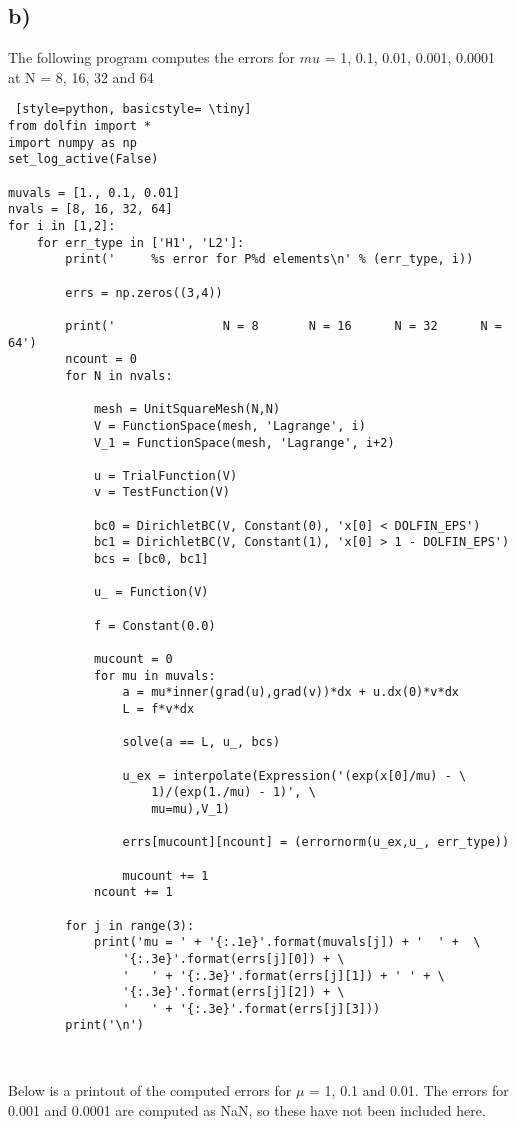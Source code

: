 \documentclass[a4paper,english,12pt,twoside]{article}
\begin{document}
\subsection*{b)}

The following program computes the errors for $mu$ = 1, 0.1, 0.01, 0.001, 0.0001 at N = 8, 16, 32 and 64
\begin{lstlisting} [style=python, basicstyle= \tiny]
from dolfin import *
import numpy as np
set_log_active(False)

muvals = [1., 0.1, 0.01]
nvals = [8, 16, 32, 64]
for i in [1,2]:
	for err_type in ['H1', 'L2']:
		print('	    %s error for P%d elements\n' % (err_type, i))

		errs = np.zeros((3,4))

		print('           	  N = 8  	  N = 16 	  N = 32  	  N = 64')
		ncount = 0
		for N in nvals:
		
			mesh = UnitSquareMesh(N,N)
			V = FunctionSpace(mesh, 'Lagrange', i)
			V_1 = FunctionSpace(mesh, 'Lagrange', i+2)

			u = TrialFunction(V)
			v = TestFunction(V)

			bc0 = DirichletBC(V, Constant(0), 'x[0] < DOLFIN_EPS')
			bc1 = DirichletBC(V, Constant(1), 'x[0] > 1 - DOLFIN_EPS')
			bcs = [bc0, bc1]

			u_ = Function(V)

			f = Constant(0.0)
			
			mucount = 0
			for mu in muvals:
				a = mu*inner(grad(u),grad(v))*dx + u.dx(0)*v*dx
				L = f*v*dx

				solve(a == L, u_, bcs)
				
				u_ex = interpolate(Expression('(exp(x[0]/mu) - \
					1)/(exp(1./mu) - 1)', \
					mu=mu),V_1)

				errs[mucount][ncount] = (errornorm(u_ex,u_, err_type))

				mucount += 1
			ncount += 1

		for j in range(3):
			print('mu = ' + '{:.1e}'.format(muvals[j]) + '	' +  \
				'{:.3e}'.format(errs[j][0]) + \
				'	' + '{:.3e}'.format(errs[j][1]) + '	' + \
				'{:.3e}'.format(errs[j][2]) + \
				'	' + '{:.3e}'.format(errs[j][3]))
		print('\n')



\end{lstlisting}
Below is a printout of the computed errors for $\mu$ = 1, 0.1 and 0.01. The errors for 0.001 and 0.0001 are computed as NaN, so these have not been included here.
\end{document}
